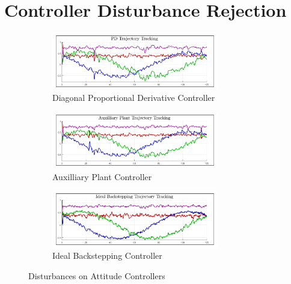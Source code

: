\section{Controller Disturbance Rejection}
\label{app:disturbance}
\begin{figure}[htbp]
\centering
\begin{subfigure}{\textwidth}
\centering
\includegraphics[width=0.8\textwidth]{graphs/PD_Diagonal_Trajectory_dist}
\caption{Diagonal Proportional Derivative Controller}
\label{fig:app-attitude-pd-dist}
\end{subfigure}
\begin{subfigure}{\textwidth}
\centering
\includegraphics[width=0.8\textwidth]{graphs/XPD_Trajectory_dist}
\caption{Auxilliary Plant Controller}
\label{fig:app-attitude-xpd-dist}
\end{subfigure}
\begin{subfigure}{\textwidth}
\centering
\includegraphics[width=0.8\textwidth]{graphs/IBC_Trajectory_dist}
\caption{Ideal Backstepping Controller}
\label{fig:app-attitude-ibc-dist}
\end{subfigure}
\caption{Disturbances on Attitude Controllers}
\end{figure}
\par
